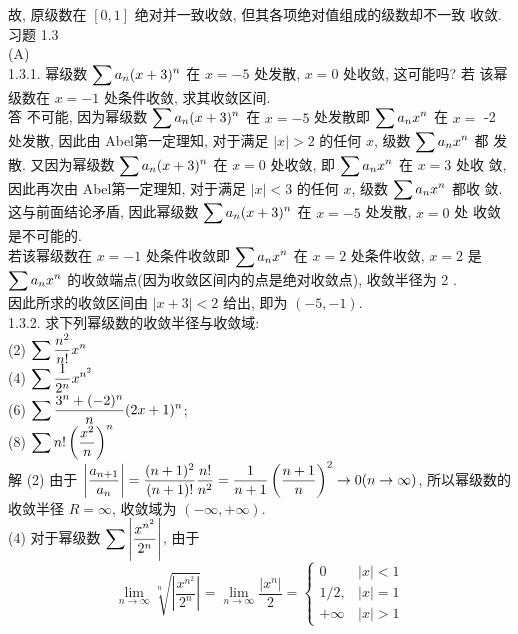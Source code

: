 \documentclass[a4paper,11pt,UTF8]{article}
\begin{document}
故, 原级数在 $[0,1]$ 绝对并一致收敛, 但其各项绝对值组成的级数却不一致 收敛.\\
习题 1.3\\
(A)\\
1.3.1. 幂级数 $\displaystyle \displaystyle \displaystyle \sum a_n(x+3)^n$ 在 $x=-5$ 处发散, $x=0$ 处收敛, 这可能吗? 若 该幂级数在 $x=-1$ 处条件收敛, 求其收敛区间.\\
答 不可能, 因为幂级数 $\displaystyle \displaystyle \displaystyle \sum a_n(x+3)^n$ 在 $x=-5$ 处发散即 $\displaystyle \displaystyle \displaystyle \sum a_n x^n$ 在 $x=$ -2 处发散, 因此由 Abel第一定理知, 对于满足 $|x|>2$ 的任何 $x$, 级数 $\displaystyle \displaystyle \displaystyle \sum a_n x^n$ 都 发散. 又因为幂级数 $\displaystyle \displaystyle \displaystyle \sum a_n(x+3)^n$ 在 $x=0$ 处收敛, 即 $\displaystyle \displaystyle \displaystyle \sum a_n x^n$ 在 $x=3$ 处收 敛, 因此再次由 Abel第一定理知, 对于满足 $|x|<3$ 的任何 $x$, 级数 $\displaystyle \displaystyle \displaystyle \sum a_n x^n$ 都收 敛. 这与前面结论矛盾, 因此幂级数 $\displaystyle \displaystyle \displaystyle \sum a_n(x+3)^n$ 在 $x=-5$ 处发散, $x=0$ 处 收敛是不可能的.\\
若该幂级数在 $x=-1$ 处条件收敛即 $\displaystyle \displaystyle \displaystyle \sum a_n x^n$ 在 $x=2$ 处条件收敛, $x=2$ 是 $\displaystyle \displaystyle \displaystyle \sum a_n x^n$ 的收敛端点(因为收敛区间内的点是绝对收敛点), 收敛半径为 2 .\\
因此所求的收敛区间由 $|x+3|<2$ 给出, 即为 $(-5,-1)$.\\
1.3.2. 求下列幂级数的收敛半径与收敛域:\\
(2) $\displaystyle \displaystyle \sum \frac{n^2}{n !} x^n$\\
(4) $\displaystyle \displaystyle \sum \frac{1}{2^n} x^{n^2}$\\
(6) $\displaystyle \displaystyle \sum \frac{3^n+(-2)^n}{n}(2 x+1)^n$;\\
(8) $\displaystyle \displaystyle \sum n !\left(\frac{x^2}{n}\right)^n$\\
解 (2) 由于 $\displaystyle \displaystyle \left|\frac{a_{n+1}}{a_n}\right|=\frac{(n+1)^2}{(n+1) !} \frac{n !}{n^2}=\frac{1}{n+1}\left(\frac{n+1}{n}\right)^2 \rightarrow 0(n \rightarrow \infty)$,
所以幂级数的收敛半径 $R=\infty$, 收敛域为 $(-\infty,+\infty)$.\\
(4) 对于幂级数 $\displaystyle \displaystyle \sum\left|\frac{x^{n^2}}{2^n}\right|$, 由于
$$
\lim _{n \rightarrow \infty} \sqrt[n]{\left|\frac{x^{n^2}}{2^n}\right|}=\lim _{n \rightarrow \infty} \frac{\left|x^n\right|}{2}= \begin{cases}0 & |x|<1 \\ 1 / 2, & |x|=1 \\ +\infty & |x|>1\end{cases}
$$
\end{document}
